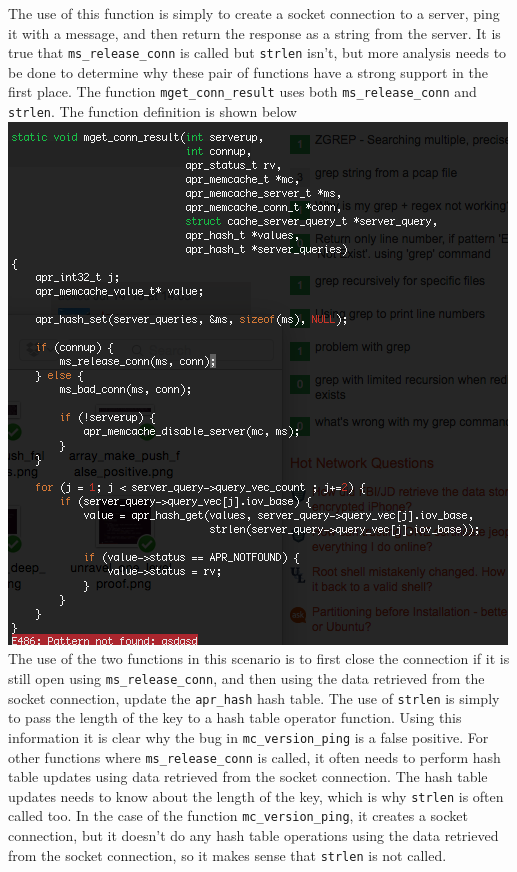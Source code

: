 \documentclass{article}
\begin{document}
The use of this function is simply to create a socket connection to a server, ping it with a message, and then return the response as a string from the server. It is true that \verb|ms_release_conn| is called but \verb|strlen| isn't, but more analysis needs to be done to determine why these pair of functions have a strong support in the first place. The function \verb|mget_conn_result| uses both \verb|ms_release_conn| and \verb|strlen|. The function definition is shown below \\
\includegraphics[scale=0.5]{ss/ms_release_conn_strlen_usage.png} \\
The use of the two functions in this scenario is to first close the connection if it is still open using \verb|ms_release_conn|, and then using the data retrieved from the socket connection, update the \verb|apr_hash| hash table. The use of \verb|strlen| is simply to pass the length of the key to a hash table operator function. Using this information it is clear why the bug in \verb|mc_version_ping| is a false positive. For other functions where \verb|ms_release_conn| is called, it often needs to perform hash table updates using data retrieved from the socket connection. The hash table updates needs to know about the length of the key, which is why \verb|strlen| is often called too. In the case of the function \verb|mc_version_ping|, it creates a socket connection, but it doesn't do any hash table operations using the data retrieved from the socket connection, so it makes sense that \verb|strlen| is not called.
\end{document}
